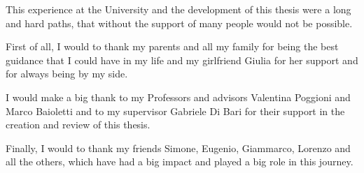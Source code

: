 This experience at the University and the development of this thesis were a long and hard paths, that without the support of many people would not be possible.

First of all, I would to thank my parents and all my family for being the best guidance that I could have in my life and my girlfriend Giulia for her support and for always being by my side.

I would make a big thank to my Professors and advisors Valentina Poggioni and Marco Baioletti and to my supervisor Gabriele Di Bari for their support in the creation and review of this thesis.

Finally, I would to thank my friends Simone, Eugenio, Giammarco, Lorenzo and all the others, which have had a big impact and played a big role in this journey.
